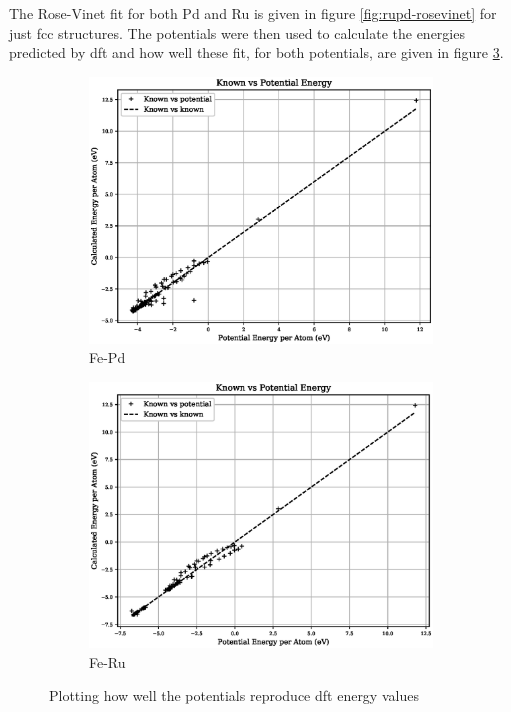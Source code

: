 The Rose-Vinet fit for both Pd and Ru is given in figure \ref{fig:rupd-rosevinet} for just \acrshort{fcc} structures.  The potentials were then used to calculate the energies predicted by \acrshort{dft} and how well these fit, for both potentials, are given in figure \ref{fig:fepd-feru-fit}.

\begin{figure}[htb]
\begin{subfigure}{.48\textwidth}
  \centering
  \includegraphics[width=.94\linewidth]{chapters/potentials_fe_pd_ru/fepd_potential/potential_known_energy_full_set.eps} 
  \caption{Fe-Pd}
  \label{fig:fepd-fit}
\end{subfigure}
\begin{subfigure}{.48\textwidth}
  \centering
  \includegraphics[width=.94\linewidth]{chapters/potentials_fe_pd_ru/feru_potential/potential_known_energy_full_set.eps} 
  \caption{Fe-Ru}
  \label{fig:feru-fit}
\end{subfigure}
\caption{Plotting how well the potentials reproduce \acrshort{dft} energy values}
\label{fig:fepd-feru-fit}
\end{figure}



